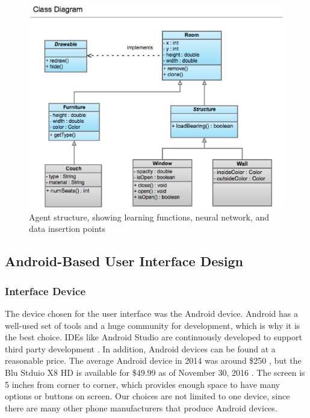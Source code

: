 \documentclass[draftclsnofoot,onecolumn,letterpaper,10pt]{IEEEtran}
\begin{document}
\begin{figure}\label{fig:AgentStructure}
\begin{center}
	\caption{Agent structure, showing learning functions, neural network, and data insertion points}
	\includegraphics[scale=0.3]{tmp.eps}
\end{center}
\end{figure}

\subsection{Android-Based User Interface Design} %
\subsubsection{Interface Device}
The device chosen for the user interface was the Android device.
Android has a well-used set of tools and a huge community for development, which is why it is the best choice.
IDEs like Android Studio are continuously developed to support third party development \cite{AndroidStudio}.
In addition, Android devices can be found at a reasonable price.
The average Android device in 2014 was around \$250 \cite{AndroidStats}, but the Blu Stduio X8 HD is available for \$49.99 as of November 30, 2016 \cite{BluStudioX8}.
The screen is 5 inches from corner to corner, which provides enough space to have many options or buttons on screen.
Our choices are not limited to one device, since there are many other phone manufacturers that produce Android devices.
\end{document}
